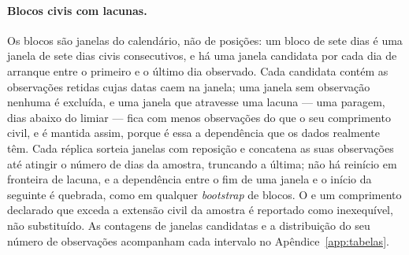 \paragraph{Blocos civis com lacunas.} Os blocos são janelas do calendário,
não de posições: um bloco de sete dias é uma janela de sete dias civis
consecutivos, e há uma janela candidata por cada dia de arranque entre o
primeiro e o último dia observado. Cada candidata contém as observações
retidas cujas datas caem na janela; uma janela sem observação nenhuma é
excluída, e uma janela que atravesse uma lacuna --- uma paragem, dias abaixo
do limiar --- fica com menos observações do que o seu comprimento civil, e é
mantida assim, porque é essa a dependência que os dados realmente têm. Cada
réplica sorteia janelas com reposição e concatena as suas observações até
atingir o número de dias da amostra, truncando a última; não há reinício
em fronteira de lacuna, e a dependência entre o fim de uma janela e o início
da seguinte é quebrada, como em qualquer \emph{bootstrap} de blocos. O
 e um comprimento declarado que exceda a extensão civil da amostra é
reportado como inexequível, não substituído. As contagens de janelas
candidatas e a distribuição do seu número de observações acompanham cada
intervalo no Apêndice~\ref{app:tabelas}.

